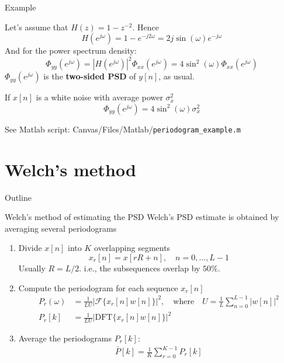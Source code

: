 \documentclass[10pt, aspectratio=169, handout]{beamer}
\begin{document}
\begin{frame}{Example}

\begin{center}
\end{center}

Let's assume that $H(z) = 1 - z^{-2}$. Hence
\begin{equation*}
	H(e^{j\omega}) = 1 - e^{-j2\omega} = 2j\sin(\omega)e^{-j\omega}
\end{equation*}
And for the power spectrum density:
\begin{equation*}
	\Phi_{yy}(e^{j\omega}) = |H(e^{j\omega})|^2\Phi_{xx}(e^{j\omega}) = 4\sin^2(\omega)\Phi_{xx}(e^{j\omega})
\end{equation*}
$\Phi_{yy}(e^{j\omega})$ is the \textbf{two-sided PSD} of $y[n]$, as usual.
\vspace{0.25cm}

If $x[n]$ is a white noise with average power $\sigma_x^2$
\begin{equation*}
\Phi_{yy}(e^{j\omega}) = 4\sin^2(\omega)\sigma_x^2
\end{equation*}

See Matlab script: Canvas/Files/Matlab/\texttt{periodogram\_example.m}
\end{frame}

\section{Welch's method}
\begin{frame}{Outline}
\tableofcontents[currentsection]
\end{frame}
\begin{frame}{Welch's method of estimating the PSD}
	Welch's PSD estimate is obtained by averaging several periodograms
	
	\begin{enumerate}
	\item Divide $x[n]$ into $K$ overlapping segments
		\begin{equation*}
			x_r[n] = x[rR + n], \quad n = 0, \ldots, L-1
		\end{equation*}
		Usually $R = L/2$. i.e., the subsequences overlap by $50\%$.
	\item Compute the periodogram for each sequence $x_r[n]$
		\begin{align*}
			P_r(\omega) &= \frac{1}{LU}|\mathcal{F}\{x_r[n]w[n]\}|^2, \quad\text{where}\quad U = \frac{1}{L}\sum_{n = 0}^{L-1}|w[n]|^2 \\
			P_r[k] &= \frac{1}{LU}|\mathrm{DFT}\{x_r[n]w[n]\}|^2
		\end{align*}
	\item Average the periodograms $P_r[k]$:
		\begin{align*}
			\bar{P}[k] = \frac{1}{K}\sum_{r = 0}^{K-1}P_r[k]
		\end{align*}
	\end{enumerate}
\end{frame}
\end{document}
